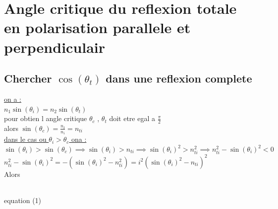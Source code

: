 \documentclass[12pt]{book}
\begin{document}
        \section{Angle critique du reflexion totale en polarisation parallele et perpendiculair}
            \subsection{Chercher $\cos(\theta_t)$ dans une reflexion complete}
                \underline{on a :} \\
                $n_1\sin(\theta_i) = n_2\sin(\theta_t)$ \\
                pour obtien l angle critique $\theta_c $ , $\theta_t $ doit etre egal a $\frac{\pi}{2}$ \\
                alors $\sin(\theta_c) = \frac{n_t}{n_i} =n_{ti}$\\
                \underline{dans le cas ou $\theta_i > \theta_c$ ona :}\\
                $ \sin(\theta_i) > \sin(\theta_c) \implies \sin(\theta_i) > n_{ti} \implies \sin(\theta_i)^2 > n_{ti}^2 \implies n_{ti}^2 - \sin(\theta_i)^2 < 0 $\\
                $n_{ti}^2 - \sin(\theta_i)^2 = -(\sin(\theta_i)^2-n_{ti}^2) = i^2(\sin(\theta_i)^2 -n_{ti})^2$ \\
                Alors  \\
                \begin{center}
                     \\
                    equation (1)
                \end{center}
\end{document}
